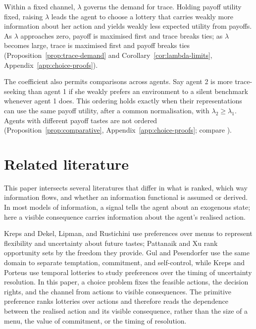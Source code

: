 \documentclass[11pt,a4paper]{article}
\theoremstyle{definition}
\newcommand{\1}{\mathbf 1}
\begin{document}
Within a fixed channel, $\lambda$ governs the demand for trace.  Holding payoff utility fixed, raising $\lambda$
leads the agent to choose a lottery that carries weakly more information about her action and yields weakly less
expected utility from payoffs.  As $\lambda$ approaches zero, payoff is maximised first and trace breaks ties; as
$\lambda$ becomes large, trace is maximised first and payoff breaks ties
(Proposition~\ref{prop:trace-demand} and Corollary~\ref{cor:lambda-limits},
Appendix~\ref{app:choice-proofs}).

The coefficient also permits comparisons across agents.  Say agent 2 is more trace-seeking than agent 1 if she
weakly prefers an environment to a silent benchmark whenever agent 1 does.  This ordering holds exactly when
their representations can use the same payoff utility, after a common normalisation, with
$\lambda_2\ge\lambda_1$.  Agents with different payoff tastes are not ordered
(Proposition~\ref{prop:comparative}, Appendix~\ref{app:choice-proofs}; compare
\cite{GhirardatoMarinacci2002}).


\section{Related literature}\label{sec:literature}

This paper intersects several literatures that differ in what is ranked, which way information flows, and
whether an information functional is assumed or derived.  In most models of information, a signal tells the
agent about an exogenous state; here a visible consequence carries information about the agent's realised
action.

Kreps \cite{Kreps1979} and Dekel, Lipman, and Rustichini \cite{DekelLipmanRustichini2001} use preferences over
menus to represent flexibility and uncertainty about future tastes; Pattanaik and Xu \cite{PattanaikXu1990} rank
opportunity sets by the freedom they provide.  Gul and Pesendorfer \cite{GulPesendorfer2001} use the same domain
to separate temptation, commitment, and self-control, while Kreps and Porteus \cite{KrepsPorteus1978} use
temporal lotteries to study preferences over the timing of uncertainty resolution.  In this paper, a choice
problem fixes the feasible actions, the decision rights, and the channel from actions to visible consequences.
The primitive preference ranks lotteries over actions and therefore reads the dependence between the realised
action and its visible consequence, rather than the size of a menu, the value of commitment, or the timing of
resolution.
\end{document}
